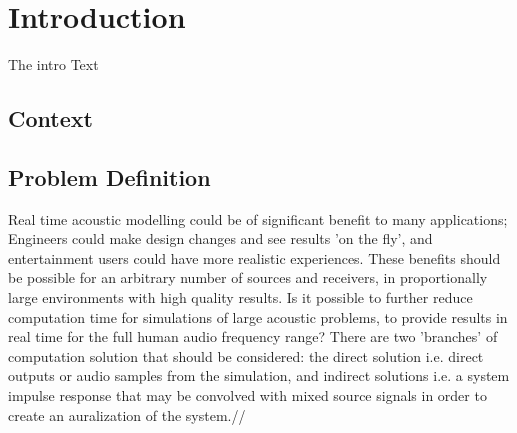\chapter{Introduction}

The intro Text

\section{Context}

\section{Problem Definition}
Real time acoustic modelling could be of significant benefit to many applications; Engineers could make design changes and see results 'on the fly', and entertainment users could have more realistic experiences. These benefits should be possible for an arbitrary number of sources and receivers, in proportionally large environments with high quality results. Is it possible to further reduce computation time for simulations of large acoustic problems, to provide results in real time for the full human audio frequency range? There are two 'branches' of computation solution that should be considered: the direct solution i.e. direct outputs or audio samples from the simulation, and indirect solutions i.e. a system impulse response that may be convolved with mixed source signals in order to create an auralization of the system.//


